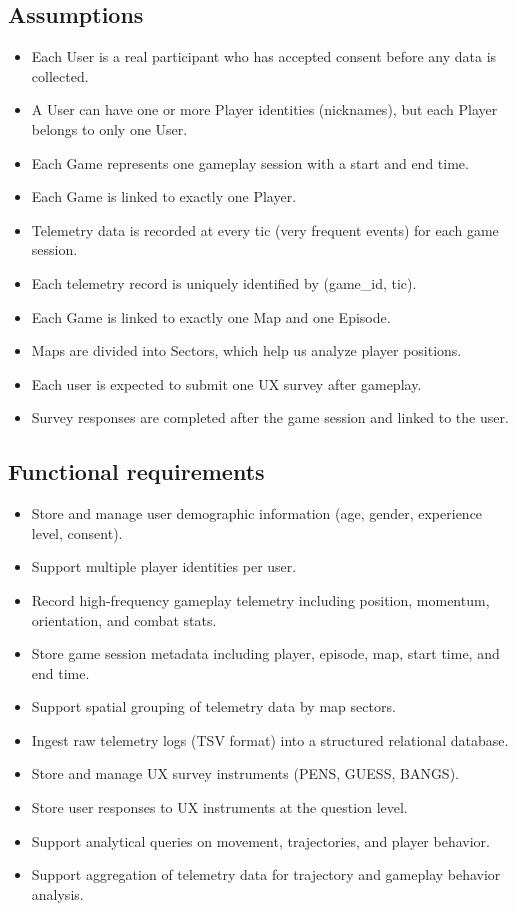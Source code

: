 \documentclass[11pt]{article}
\begin{document}
\subsection{Assumptions}
\begin{itemize}
  \item Each User is a real participant who has accepted consent before any data is collected.
  \item A User can have one or more Player identities (nicknames), but each Player belongs to only one User.
  \item Each Game represents one gameplay session with a start and end time.
  \item Each Game is linked to exactly one Player.
  \item Telemetry data is recorded at every tic (very frequent events) for each game session.
  \item Each telemetry record is uniquely identified by (game\_id, tic).
  \item Each Game is linked to exactly one Map and one Episode.
  \item Maps are divided into Sectors, which help us analyze player positions.
  \item Each user is expected to submit one UX survey after gameplay.
  \item Survey responses are completed after the game session and linked to the user.
\end{itemize}


\subsection{Functional requirements}

\begin{itemize}
  \item Store and manage user demographic information (age, gender, experience level, consent).
  \item Support multiple player identities per user.
  \item Record high-frequency gameplay telemetry including position, momentum, orientation, and combat stats.
  \item Store game session metadata including player, episode, map, start time, and end time.
  \item Support spatial grouping of telemetry data by map sectors.
  \item Ingest raw telemetry logs (TSV format) into a structured relational database.
  \item Store and manage UX survey instruments (PENS, GUESS, BANGS).
  \item Store user responses to UX instruments at the question level.
  \item Support analytical queries on movement, trajectories, and player behavior.
  \item Support aggregation of telemetry data for trajectory and gameplay behavior analysis.
\end{itemize}
\end{document}
